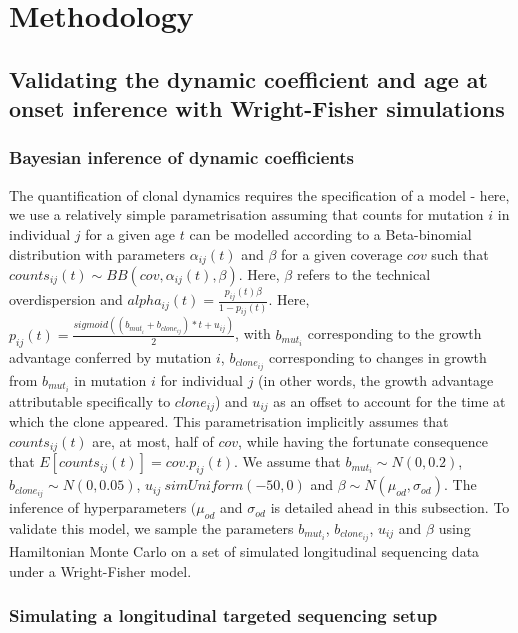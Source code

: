 \section{Methodology}

\subsection{Validating the dynamic coefficient and age at onset inference with Wright-Fisher simulations}

\subsubsection{Bayesian inference of dynamic coefficients}

The quantification of clonal dynamics requires the specification of a model - here, we use a relatively simple parametrisation assuming that counts for mutation $i$ in individual $j$ for a given age $t$ can be modelled according to a Beta-binomial distribution with parameters $\alpha_{ij}(t)$ and $\beta$ for a given coverage $cov$ such that $counts_{ij}(t) \sim BB(cov,\alpha_{ij}(t),\beta)$. Here, $\beta$ refers to the technical overdispersion and $alpha_{ij}(t) = \frac{p_{ij}(t)\beta}{1-p_{ij}(t)}$. Here, $p_{ij}(t) = \frac{sigmoid((b_{mut_i} + b_{clone_{ij}}) * t + u_{ij})}{2}$, with $b_{mut_i}$ corresponding to the growth advantage conferred by mutation $i$, $b_{clone_{ij}}$ corresponding to changes in growth from $b_{mut_i}$ in mutation $i$ for individual $j$ (in other words, the growth advantage attributable specifically to $clone_{ij}$) and $u_{ij}$ as an offset to account for the time at which the clone appeared. This parametrisation implicitly assumes that $counts_{ij}(t)$ are, at most, half of $cov$, while having the fortunate consequence that $E[counts_{ij}(t)] = cov.p_{ij}(t)$. We assume that $b_{mut_i} \sim N(0,0.2)$, $b_{clone_{ij}} \sim N(0,0.05)$, $u_{ij} \ sim Uniform(-50,0)$ and $\beta \sim N(\mu_{od},\sigma_{od})$. The inference of hyperparameters $(\mu_{od}$ and $\sigma_{od}$ is detailed ahead in this subsection. To validate this model, we sample the parameters $b_{mut_i}$, $b_{clone_{ij}}$, $u_{ij}$ and $\beta$ using Hamiltonian Monte Carlo on a set of simulated longitudinal sequencing data under a Wright-Fisher model. 

\subsubsection{Simulating a longitudinal targeted sequencing setup}

